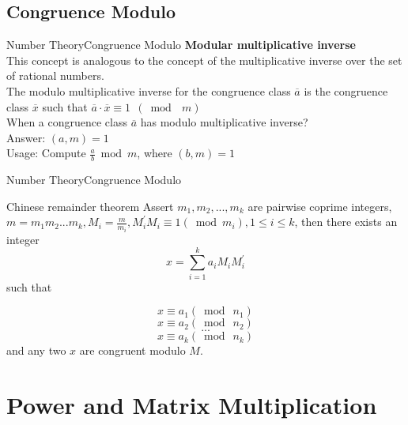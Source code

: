 \documentclass[mathserif,10pt]{beamer}
\begin{document}
\subsection{Congruence Modulo}
\begin{frame}{Number Theory}{Congruence Modulo}
\textbf{\large Modular multiplicative inverse} \\
This concept is analogous to the concept of the multiplicative inverse over the set of rational numbers.\\[0.5cm]
The modulo multiplicative inverse for the congruence class $\overline{a}$ is the congruence class $\overline{x}$ such that $\overline{a} \cdot \overline{x} \equiv 1 ~~(\bmod~~ m)$
\pause
~\\[0.2cm]
When a congruence class $\overline{a}$ has modulo multiplicative inverse?
\pause
~\\[0.2cm]
Answer: $(a, m) = 1$
\\[0.5cm]
\pause
Usage: Compute $\frac{a}{b} \bmod m$, where $(b, m) = 1$
\end{frame}


\begin{frame}{Number Theory}{Congruence Modulo}
\begin{block}{Chinese remainder theorem}
Assert $m_1, m_2, ..., m_k$ are pairwise coprime integers, $m = m_1m_2...m_k, M_i = \frac{m}{m_i}, M^{'}_iM_i\equiv 1(\bmod m_i), 1\leq i 
\leq k$, then there exists an integer $$x=\sum_{i=1}^k a_iM_i M^{'}_i$$ such that 

$$ x \equiv a_1 (\bmod~n_1) $$
$$ x \equiv a_2 (\bmod~n_2) $$
$$ ... $$
$$ x\equiv a_k (\bmod~n_k) $$
and any two $x$ are congruent modulo $M$.
\end{block}
\end{frame}


\section{Power and Matrix Multiplication}
\end{document}
